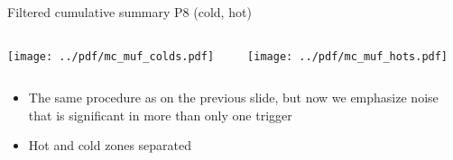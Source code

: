 \documentclass[9pt]{beamer}
\begin{document}
\begin{frame}[t]{Filtered cumulative summary P8 (cold, hot)}
\begin{columns}[T]
  \begin{column}{.5\textwidth}
  \texttt{[image: ../pdf/mc\_muf\_colds.pdf]}
  \end{column}
  \begin{column}{.5\textwidth}
  \texttt{[image: ../pdf/mc\_muf\_hots.pdf]}
  \end{column}
\end{columns}
\begin{itemize}
 \item The same procedure as on the previous slide, but now we emphasize noise that is significant in more than only one trigger
 \item Hot and cold zones separated
\end{itemize}
\end{frame}
\end{document}
